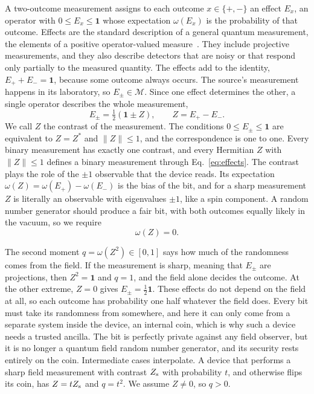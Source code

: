 \documentclass[11pt,a4paper]{article}
\providecommand{\openone}{\mathbf{1}}
\newcommand{\M}{\mathcal M}
\newcommand{\id}{\openone}
\begin{document}
A two-outcome measurement assigns to each outcome $x\in\{+,-\}$ an effect $E_x$, an operator with $0\le E_x\le\id$ whose expectation $\omega(E_x)$ is the probability of that outcome. Effects are the standard description of a general quantum measurement, the elements of a positive operator-valued measure~\cite{helstrom1969quantum}. They include projective measurements, and they also describe detectors that are noisy or that respond only partially to the measured quantity. The effects add to the identity, $E_++E_-=\id$, because some outcome always occurs. The source's measurement happens in its laboratory, so $E_\pm\in\M$. Since one effect determines the other, a single operator describes the whole measurement,
\begin{equation}
 E_\pm=\tfrac12(\id\pm Z),\qquad Z=E_+-E_- .
 \label{eq:effects}
\end{equation}
We call $Z$ the contrast of the measurement. The conditions $0\le E_\pm\le\id$ are equivalent to $Z=Z^*$ and $\|Z\|\le1$, and the correspondence is one to one. Every binary measurement has exactly one contrast, and every Hermitian $Z$ with $\|Z\|\le1$ defines a binary measurement through Eq.~\eqref{eq:effects}. The contrast plays the role of the $\pm1$ observable that the device reads. Its expectation $\omega(Z)=\omega(E_+)-\omega(E_-)$ is the bias of the bit, and for a sharp measurement $Z$ is literally an observable with eigenvalues $\pm1$, like a spin component. A random number generator should produce a fair bit, with both outcomes equally likely in the vacuum, so we require
\begin{equation}
 \omega(Z)=0 .
 \label{eq:fair}
\end{equation}

The second moment $q=\omega(Z^2)\in[0,1]$ says how much of the randomness comes from the field. If the measurement is sharp, meaning that $E_\pm$ are projections, then $Z^2=\id$ and $q=1$, and the field alone decides the outcome. At the other extreme, $Z=0$ gives $E_\pm=\tfrac12\id$. These effects do not depend on the field at all, so each outcome has probability one half whatever the field does. Every bit must take its randomness from somewhere, and here it can only come from a separate system inside the device, an internal coin, which is why such a device needs a trusted ancilla. The bit is perfectly private against any field observer, but it is no longer a quantum field random number generator, and its security rests entirely on the coin. Intermediate cases interpolate. A device that performs a sharp field measurement with contrast $Z_{\rm s}$ with probability $t$, and otherwise flips its coin, has $Z=tZ_{\rm s}$ and $q=t^2$. We assume $Z\ne0$, so $q>0$.
\end{document}
